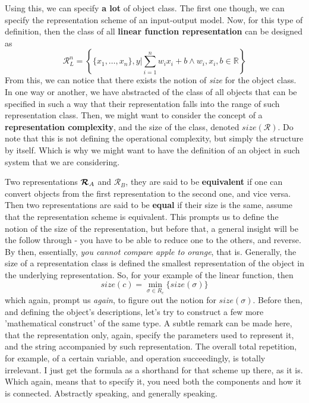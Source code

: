 Using this, we can specify \textbf{a lot} of object class. The first one though, we can specify the representation scheme of an input-output model. Now, for this type of definition, then the class of all \textbf{linear function representation} can be designed as 
\begin{equation}
    \bm{\mathcal{R}}_{L}^{n} = \left\{ \{x_{1},\dots,x_{n}\}, y \Bigg| \sum_{i=1}^{n}w_{i}x_{i} + b \land w_{i}, x_{i}, b \in \mathbb{R} \right\}
\end{equation}
From this, we can notice that there exists the notion of \textit{size} for the object class. In one way or another, we have abstracted of the class of all objects that can be specified in such a way that their representation falls into the range of such representation class. Then, we might want to consider the concept of a \textbf{representation complexity}, and the size of the class, denoted $size(\bm{\mathcal{R}})$. Do note that this is not defining the operational complexity, but simply the structure by itself. Which is why we might want to have the definition of an object in such system that we are considering.

Two representations $\bm{\mathcal{R}}_{A}$ and $\mathcal{R}_{B}$, they are said to be \textbf{equivalent} if one can convert objects from the first representation to the second one, and vice versa. Then two representations are said to be \textbf{equal} if their size is the same, assume that the representation scheme is equivalent. This prompts us to define the notion of the size of the representation, but before that, a general insight will be the follow through - you have to be able to reduce one to the others, and reverse. By then, essentially, \textit{you cannot compare apple to orange}, that is. Generally, the size of a representation class is defined the smallest representation of the object in the underlying representation. So, for your example of the linear function, then 
\begin{equation}
    size(c)=\min_{\sigma \in R_{c}}\{size(\sigma)\}
\end{equation}
which again, prompt us \textit{again}, to figure out the notion for $size(\sigma)$. Before then, and defining the object's descriptions, let's try to construct a few more 'mathematical construct' of the same type. A subtle remark can be made here, that the representation only, again, specify the parameters used to represent it, and the string accompanied by such representation. The overall total repetition, for example, of a certain variable, and operation succeedingly, is totally irrelevant. I just get the formula as a shorthand for that scheme up there, as it is. Which again, means that to specify it, you need both the components and how it is connected. Abstractly speaking, and generally speaking. 

